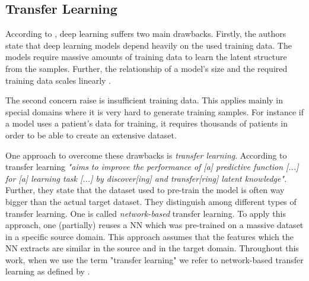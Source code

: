 \subsection{Transfer Learning}
\label{chp:fundamentals:sec:machine_learning:subsec:transfer_learning}
According to \textcite{Tan:2018}, deep learning suffers two main drawbacks.
Firstly, the authors state that deep learning models depend heavily on the used training data.
The models require massive amounts of training data to learn the latent structure from the samples.
Further, the relationship of a model's size and the required training data scales linearly \parencite{Tan:2018}.

The second concern \textcite{Tan:2018} raise is insufficient training data.
This applies mainly in special domains where it is very hard to generate training samples.
For instance if a model uses a patient's data for training, it requires thousands of patients in order to be able to create an extensive dataset.

One approach to overcome these drawbacks is \textit{transfer learning}.
According to \textcite{Tan:2018} transfer learning \textit{"aims to improve the performance of [a] predictive function [...] for [a] learning task [...] by discover[ing] and transfer[ring] latent knowledge"}.
Further, they state that the dataset used to pre-train the model is often way bigger than the actual target dataset.
They distinguish among different types of transfer learning.
One is called \textit{network-based} transfer learning.
To apply this approach, one (partially) reuses a \ac{NN} which was pre-trained on a massive dataset in a specific source domain.
This approach assumes that the features which the \ac{NN} extracts are similar in the source and in the target domain.
Throughout this work, when we use the term "transfer learning" we refer to network-based transfer learning as defined by \textcite{Tan:2018}.

